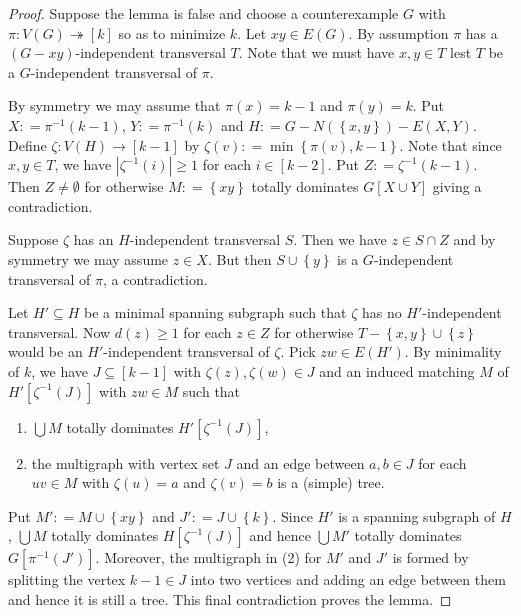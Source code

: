 \documentclass[12pt]{article}
\theoremstyle{plain}
\theoremstyle{definition}
\theoremstyle{remark}
\newcommand{\surj}{\twoheadrightarrow}
\newcommand{\set}[1]{\left\{ #1 \right\}}
\newcommand{\card}[1]{\left|#1\right|}
\newcommand{\func}[3]{#1\colon #2 \rightarrow #3}
\newcommand{\funcsurj}[3]{#1\colon #2 \surj #3}
\newcommand{\irange}[1]{\left[#1\right]}
\newcommand{\brackets}[1]{\left[ #1 \right]}
\newcommand{\DefinedAs}{\mathrel{\mathop:}=}
\begin{document}
\begin{proof}
Suppose the lemma is false and choose a counterexample $G$ with
$\funcsurj{\pi}{V(G)}{\irange{k}}$ so as to minimize $k$.  Let $xy \in E(G)$.
By assumption $\pi$ has a $(G-xy)$-independent transversal $T$.  Note that we
must have $x,y \in T$ lest $T$ be a $G$-independent transversal of $\pi$.

By symmetry we may assume that $\pi(x) = k-1$ and $\pi(y) = k$. Put $X
\DefinedAs \pi^{-1}(k-1)$, $Y \DefinedAs \pi^{-1}(k)$ and $H \DefinedAs G -
N(\set{x, y}) - E(X,Y)$. Define $\func{\zeta}{V(H)}{\irange{k-1}}$ by $\zeta(v)
\DefinedAs \min\set{\pi(v), k-1}$. Note that since $x,y \in T$, we have
$\card{\zeta^{-1}(i)} \geq 1$ for each $i \in \irange{k-2}$.  Put $Z \DefinedAs
\zeta^{-1}(k-1)$. Then $Z \neq \emptyset$ for otherwise $M \DefinedAs \set{xy}$
totally dominates $G[X \cup Y]$ giving a contradiction.

Suppose $\zeta$ has an $H$-independent transversal $S$.  Then we have $z \in S
\cap Z$ and by symmetry we may assume $z \in X$.  But then $S \cup \set{y}$ is
a $G$-independent transversal of $\pi$, a contradiction.

Let $H' \subseteq H$ be a minimal spanning subgraph such that $\zeta$ has no
$H'$-independent transversal.  Now $d(z) \geq 1$ for each $z \in Z$ for
otherwise $T - \set{x,y} \cup \set{z}$ would be an $H'$-independent transversal
of $\zeta$.  Pick $zw \in E(H')$.  By minimality of $k$, we have $J \subseteq
\irange{k-1}$ with $\zeta(z), \zeta(w) \in J$ and an induced matching $M$ of
$H'\brackets{\zeta^{-1}(J)}$ with $zw \in M$ such that
\begin{enumerate}
  \item $\bigcup M$ totally dominates $H'\brackets{\zeta^{-1}(J)}$,
  \item the multigraph with vertex set $J$ and an edge between $a, b \in J$ for
  each $uv \in M$ with $\zeta(u) = a$ and $\zeta(v) = b$ is a (simple) tree.
\end{enumerate}

Put $M' \DefinedAs M \cup \set{xy}$ and $J' \DefinedAs J \cup \set{k}$.
Since $H'$ is a spanning subgraph of $H$, $\bigcup M$ totally dominates
$H\brackets{\zeta^{-1}(J)}$ and hence $\bigcup M'$ totally dominates
$G\brackets{\pi^{-1}(J')}$.  Moreover, the multigraph in (2) for $M'$ and $J'$
is formed by splitting the vertex $k-1 \in J$ into two vertices and adding an edge
between them and hence it is still a tree.  This final contradiction proves the
lemma.
\end{proof}
\end{document}
